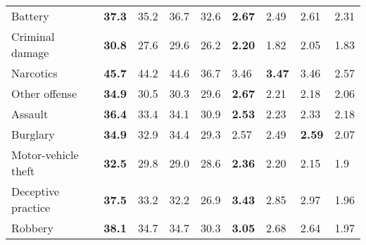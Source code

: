 \documentclass[review]{elsarticle}
\begin{document}
\begin{table}
\begin{center}
\begin{tabular}{@{}p{9em}p{3em}p{3em}p{3em}p{3em}p{3em}p{3em}p{3em}p{3em}@{}}
Battery              &\bf  37.3 & 35.2 & 36.7 &32.6 &\bf  2.67 & 2.49 & 2.61 &2.31 \\
Criminal damage      &\bf  30.8 & 27.6 & 29.6 &26.2 &\bf  2.20 & 1.82 & 2.05 &1.83\\
Narcotics            &\bf  45.7 & 44.2 & 44.6 &36.7 & 3.46 &\bf  3.47 & 3.46 &2.57\\
Other offense        &\bf  34.9 & 30.5 & 30.3 &29.6 &\bf  2.67 & 2.21 & 2.18 & 2.06\\
Assault              &\bf  36.4 & 33.4 & 34.1 & 30.9 &\bf  2.53 & 2.23 & 2.33 & 2.18\\
Burglary             &\bf  34.9 & 32.9 & 34.4 &29.3 & 2.57 & 2.49 &\bf 2.59 & 2.07\\
Motor-vehicle theft  &\bf  32.5 & 29.8 & 29.0 &28.6&\bf  2.36 & 2.20 & 2.15 & 1.9\\
Deceptive practice   &\bf  37.5 & 33.2 & 32.2 &26.9&\bf  3.43 & 2.85 & 2.97 &1.96\\
Robbery              &\bf  38.1 & 34.7 & 34.7 &30.3&\bf  3.05 & 2.68 & 2.64 & 1.97\\
\bottomrule[1.25pt]
\end{tabular}
\end{center}
\label{table-oneday}
\end{table}
\end{document}
